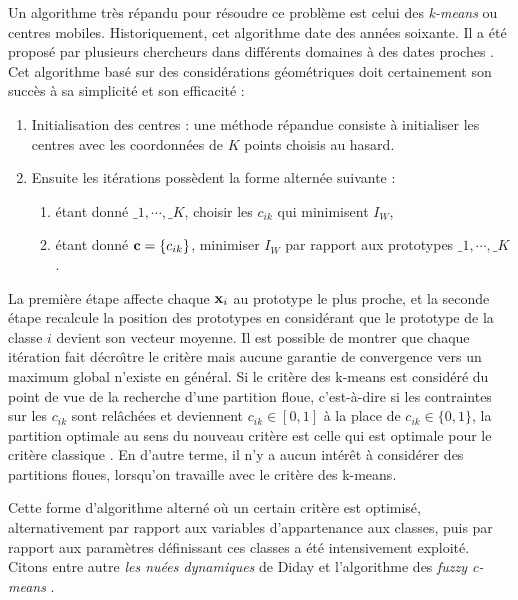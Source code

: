 Un algorithme tr\`es r\'epandu pour r\'esoudre ce probl\`eme est celui
des {\em k-means} ou centres mobiles. Historiquement, cet algorithme date
des ann\'ees soixante. Il a \'et\'e propos\'e par plusieurs chercheurs
dans diff\'erents domaines \`a des dates proches 
\cite{Edwards1965,Lloyd1957}. Cet algorithme bas\'e sur des consid\'erations
g\'eom\'etriques doit certainement son succ\`es \`a sa simplicit\'e et son efficacit\'e  :
\begin{enumerate}
\item Initialisation des centres : une m\'ethode r\'epandue consiste \`a initialiser les
centres avec les coordonn\'ees de $K$ points choisis au hasard.
\item Ensuite les it\'erations poss\`edent la forme altern\'ee suivante :
\begin{enumerate}
\item \'etant donn\'e $\bm_1,\cdots,\bm_K$, choisir les $c_{ik}$ qui 
minimisent $I_W$,
\item \'etant donn\'e $\mbox{\bf c}=\{c_{ik}\}$, minimiser $I_W$ par rapport aux 
prototypes $\bm_1,\cdots,\bm_K$.
\end{enumerate}
\end{enumerate}

La premi\`ere \'etape affecte chaque $\mbox{\bf x}_i$ au prototype le plus proche, et
la seconde \'etape recalcule la position des prototypes en consid\'erant
que le prototype de la classe $i$ devient son vecteur moyenne. Il est possible de
montrer que chaque it\'eration fait d\'ecro\^{\i}tre le crit\`ere mais aucune 
garantie de convergence vers un maximum global n'existe en g\'en\'eral.
Si le crit\`ere des k-means est consid\'er\'e du point de vue de la recherche
d'une partition floue, c'est-\`a-dire si les contraintes sur les $c_{ik}$ sont
rel\^ach\'ees et deviennent $c_{ik}\in [0,1]$ \`a la place de $c_{ik}\in \{0,1\}$,
la partition optimale au sens du nouveau crit\`ere est celle qui est optimale 
pour le crit\`ere classique \cite{Selim1984}. En d'autre terme, il n'y a aucun 
int\'er\^et \`a consid\'erer des partitions floues, lorsqu'on travaille
avec le crit\`ere des k-means.

Cette forme d'algorithme altern\'e o\`u un certain crit\`ere est optimis\'e,
alternativement par rapport aux variables d'appartenance aux classes, puis
par rapport aux param\`etres d\'efinissant ces classes a \'et\'e intensivement
exploit\'e. Citons entre autre {\em les nu\'ees dynamiques} de Diday \cite{Diday1971}
et l'algorithme des {\em fuzzy c-means} \cite{Bezdeck1974}.

